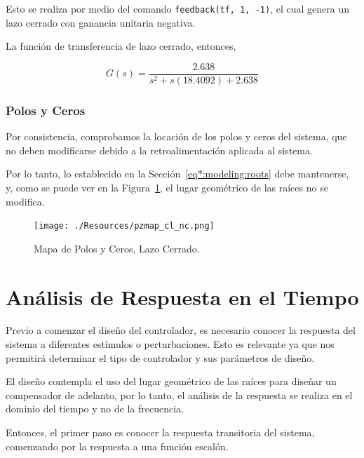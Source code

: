 \documentclass[12pt,a4paper]{article}
\begin{document}
        Esto se realiza por medio del comando \verb|feedback(tf, 1, -1)|, el cual genera un lazo cerrado con ganancia 
        unitaria negativa. 

        La función de transferencia de lazo cerrado, entonces,

        \begin{equation}
          G\left(s\right) = \frac{2.638}{s^{2} + s\left(18.4092\right) + 2.638}
          \label{eq:model:closedLoopTf}
        \end{equation}

      \subsubsection{Polos y Ceros}
        	
        Por consistencia, comprobamos la locación de los polos y ceros del sistema, que no deben modificarse
        debido a la retroalimentación aplicada al sistema.

        Por lo tanto, lo establecido en la Sección~\ref{eq*:modeling:roots} debe mantenerse, y, como se puede ver en la 
        Figura~\ref{fig:modeling:pzmap_closed}, el lugar geométrico de las raíces no se modifica. 

        \begin{figure}
          \centering
          \texttt{[image: ./Resources/pzmap\_cl\_nc.png]}
          \caption{Mapa de Polos y Ceros, Lazo Cerrado.}
          \label{fig:modeling:pzmap_closed}
        \end{figure}

    \pagebreak

    \section{Análisis de Respuesta en el Tiempo}

    Previo a comenzar el diseño del controlador, es necesario conocer la respuesta del sistema a diferentes 
    estímulos o perturbaciones. Esto es relevante ya que nos permitirá determinar el tipo de controlador 
    y sus parámetros de diseño. 

    El diseño contempla el uso del lugar geométrico de las raíces para diseñar un compensador de adelanto, por lo 
    tanto, el análisis de la respuesta se realiza en el dominio del tiempo y no de la frecuencia. 

    Entonces, el primer paso es conocer la respuesta transitoria del sistema, comenzando por la respuesta 
    a una función escalón. 
\end{document}
